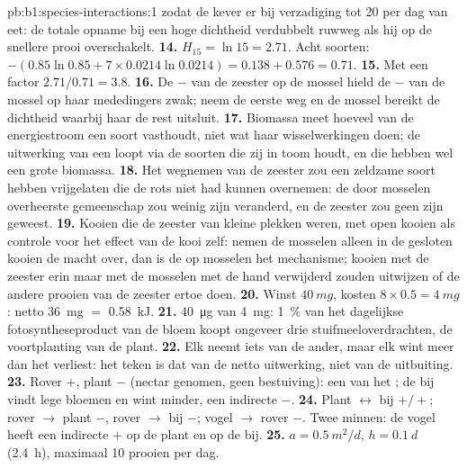 \begin{solution}{pb:b1:species-interactions:1}
zodat de kever er bij verzadiging tot 20 per dag van eet: de totale opname
bij een hoge dichtheid verdubbelt ruwweg als hij op de snellere prooi
overschakelt.
\textbf{14.} $H_{15} = \ln 15 = 2.71$. Acht soorten: $-(0.85\ln 0.85
+ 7\times 0.0214\ln 0.0214) = 0.138 + 0.576 = 0.71$.
\textbf{15.} Met een factor $2.71/0.71 = 3.8$.
\textbf{16.} De $-$ van de zeester op de mossel hield de $-$ van de mossel
op haar mededingers zwak; neem de eerste weg en de mossel bereikt de
dichtheid waarbij haar  de rest uitsluit.
\textbf{17.} Biomassa meet hoeveel van de energiestroom een soort
vasthoudt, niet wat haar wisselwerkingen doen; de uitwerking van een
 loopt via de soorten die zij in toom houdt, en die hebben
wel een grote biomassa.
\textbf{18.} Het wegnemen van de zeester zou een zeldzame soort hebben
vrijgelaten die de rots niet had kunnen overnemen: de door mosselen
overheerste gemeenschap zou weinig zijn veranderd, en de zeester zou geen
 zijn geweest.
\textbf{19.} Kooien die de zeester van kleine plekken weren, met open kooien
als controle voor het effect van de kooi zelf: nemen de mosselen alleen in de
gesloten kooien de macht over, dan is de  op mosselen het mechanisme;
kooien met de zeester erin maar met de mosselen met de hand verwijderd zouden
uitwijzen of de andere prooien van de zeester ertoe doen.
\textbf{20.} Winst $\qty{40}{mg}$, kosten $8\times 0.5 = \qty{4}{mg}$: netto
\qty{36}{mg} $=$ \qty{0.58}{kJ}.
\textbf{21.} \qty{40}{\micro g} van \qty{4}{mg}: \qty{1}{\%} van het
dagelijkse fotosyntheseproduct van de bloem koopt ongeveer drie
stuifmeeloverdrachten, de voortplanting van de plant.
\textbf{22.} Elk neemt iets van de ander, maar elk wint meer dan het
verliest: het teken is dat van de netto uitwerking, niet van de uitbuiting.
\textbf{23.} Rover $+$, plant $-$ (nectar genomen, geen bestuiving): een
 van het ; de bij vindt lege bloemen en wint minder,
een indirecte $-$.
\textbf{24.} Plant $\leftrightarrow$ bij $+/+$; rover $\to$ plant $-$,
rover $\to$ bij $-$; vogel $\to$ rover $-$. Twee minnen: de vogel heeft een
indirecte $+$ op de plant en op de bij.
\textbf{25.} $a = \qty{0.5}{m^2/d}$, $h = \qty{0.1}{d}$ (\qty{2.4}{h}),
maximaal \num{10} prooien per dag.
\end{solution}
